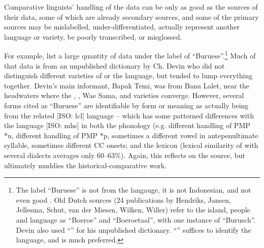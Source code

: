 Comparative linguists’ handling of the data can be only as good
as the sources of their data,
some of which are already secondary sources,
and some of the primary sources may be mislabelled,
under-differentiated, actually represent another language or
variety, be poorly transcribed, or misglossed.

For example, \citet{BlustTrussel2020} list a large quantity of
data under the label of “Buruese”.\footnote{
		The label “Buruese”
		is not from the  langauge, it is not Indonesian, and not even good .
		Old Dutch sources (24 publications by Hendriks,
		Jansen, Jellesma, Schut, van der Miesen, Wilken,
		Willer) refer to the island,
		people and language as “Boeroe”
		and “Boeroetaal”, with one instance of “Burusch”.
		Devin also used “” for his unpublished dictionary.
		“” suffices to identify the language,
		and is much preferred.}
 Much of that data is from an unpublished dictionary by Ch.
Devin who did not distinguish different varieties of  or
the  language, but tended to lump everything together.
Devin’s main informant, Bapak Temi,
was from Banu Lalet,
near the headwaters where the ,
, Wae Sama, and  varieties converge.
However, several forms cited as “Buruese” are identifiable by
form or meaning as actually being from the related  [ISO:
lcl] language -- which has some patterned differences with the
 language [ISO: mhs] in both the phonology (e.g.
different handling of PMP *u,
different handling of PMP *p,
sometimes a different vowel in antepenultimate syllable,
sometimes different CC onsets; \citet[37--38]{Grimes1991c}
and the lexicon (lexical similarity of  with several 
dialects averages only 60--63{\%}).
Again, this reflects on the source,
but ultimately muddies the historical-comparative work.

